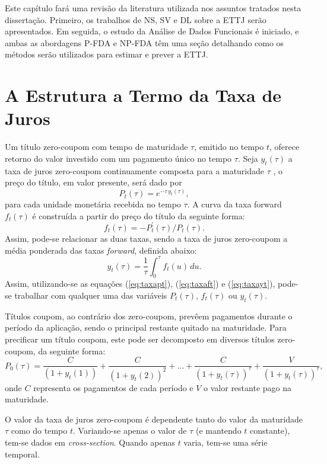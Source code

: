 \documentclass[
	12pt,				%
	openright,			%
	oneside,			%
	a4paper,			%
	english,			%
	brazil				%
	]{dissertacao-ufrgs-abntex2}
\begin{document}
Este capítulo fará uma revisão da literatura utilizada nos assuntos tratados nesta dissertação. Primeiro, os trabalhos de NS, SV e DL sobre a ETTJ serão apresentados. Em seguida, o estudo da Análise de Dados Funcionais é iniciado, e ambas as abordagens P-FDA e NP-FDA têm uma seção detalhando como os métodos serão utilizados para estimar e prever a ETTJ. 

\section{A Estrutura a Termo da Taxa de Juros}

Um título zero-coupom com tempo de maturidade $\tau$, emitido no tempo $t$, oferece retorno do valor investido com um pagamento único no tempo $\tau$. Seja $y_{t}(\tau)$ a taxa de juros zero-coupom continuamente composta para a maturidade $\tau$ , o preço do título, em valor presente, será dado por
\begin{equation}
P_{t}(\tau)=e^{-\tau\, y_{t}(\tau)},\label{eq:taxapt}
\end{equation}
para cada unidade monetária recebida no tempo $\tau$. A curva da
taxa forward $f_{t}(\tau)$ é construída a partir do preço do título
da seguinte forma:
\begin{equation}
f_{t}(\tau)=-P_{t}^{\prime}(\tau)/P_{t}(\tau).\label{eq:taxaft}
\end{equation}
Assim, pode-se relacionar as duas taxas, sendo a taxa de juros zero-coupom
a média ponderada das taxas \emph{forward}, definida abaixo:
\begin{equation}
y_{t}(\tau)=\frac{1}{\tau}\int_{0}^{\tau}f_{t}(u)\, du.\label{eq:taxayt}
\end{equation}
Assim, utilizando-se as equações (\ref{eq:taxapt}), (\ref{eq:taxaft})
e (\ref{eq:taxayt}), pode-se trabalhar com qualquer uma das variáveis
$P_{t}(\tau)$,\foreignlanguage{english}{ $f_{t}(\tau)$} ou $y_{t}(\tau)$.

Títulos coupom, ao contrário dos zero-coupom, prevêem pagamentos durante o período da aplicação, sendo o principal restante quitado na maturidade. Para precificar um título coupom, este pode ser decomposto em diversos títulos zero-coupom, da seguinte forma:
\[
P_{0}(\tau)=\frac{C}{(1+y_{t}(1))}+\frac{C}{(1+y_{t}(2))^{2}}+...+\frac{C}{(1+y_{t}(\tau))^{\tau}}+\frac{V}{(1+y_{t}(\tau))^{\tau}},
\]
onde $C$ representa os pagamentos de cada período e $V$ o valor
restante pago na maturidade.

O valor da taxa de juros zero-coupom é dependente tanto do valor da maturidade $\tau$ como do tempo $t$. 
Variando-se apenas o valor de $\tau$ (e mantendo $t$ constante),
tem-se dados em \emph{cross-section}. Quando apenas $t$ varia, tem-se
uma série temporal.
\end{document}

